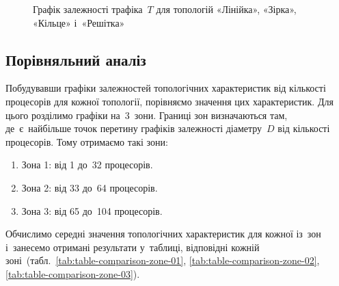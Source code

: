 \documentclass[
	a4paper,
	oneside,
	BCOR = 10mm,
	DIV = 12,
	12pt,
	headings = normal,
]{scrartcl}
\begin{document}
\begin{figure}[!htbp]
					\caption{Графік залежності трафіка~$T$ для топологій «Лінійка», «Зірка», «Кільце» і~«Решітка»}
					\label{fig:plot-comparison-traffic}
				\end{figure}

		\subsection{Порівняльний аналіз}
			Побудувавши графіки залежностей топологічних характеристик від кількості процесорів для кожної топології, порівняємо значення цих характеристик. Для цього розділимо графіки на~3~зони. Границі зон визначаються там, де~є~найбільше точок перетину графіків залежності діаметру~$D$ від кількості процесорів. Тому отримаємо такі зони:
			\begin{enumerate}
				\item Зона 1: від 1 до~32 процесорів.
				\item Зона 2: від 33 до~64 процесорів.
				\item Зона 3: від 65 до~104 процесорів.
			\end{enumerate}
			Обчислимо середні значення топологічних характеристик для кожної із~зон і~занесемо отримані результати у~таблиці, відповідні кожній зоні~(табл.~\ref{tab:table-comparison-zone-01}, \ref{tab:table-comparison-zone-02}, \ref{tab:table-comparison-zone-03}).
\end{document}
